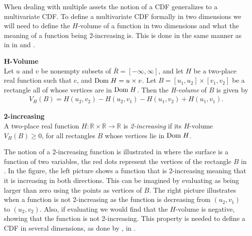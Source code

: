 When dealing with multiple assets the notion of a \gls{CDF} generalizes to a multivariate \gls{CDF}. To define a multivariate \gls{CDF} formally in two dimensions we will need to define the $H$-volume of a function in two dimensions and what the meaning of a function being 2-increasing is. This is done in the same manner as in  in  and .

\begin{definition}\label{def:H-volume} \textbf{H-Volume} \\
    Let $u$ and $v$ be nonempty subsets of $\bar{R} = [-\infty, \infty]$, and let $H$ be a two-place real function such that c, and $\mathrm{Dom \;} H = u\times v$. Let $B = [u_1,u_2]\times[v_1,v_2]$  be a rectangle all of whose vertices are in $\mathrm{Dom \;} H$. Then
    the \emph{H-volume} of $B$ is given by
    \begin{align}\label{eq:H-volume}
        V_H(B) = H(u_2,v_2) - H(u_2,v_1) - H(u_1,v_2) + H(u_1,v_1).
    \end{align}
\end{definition}

\begin{definition}\label{def:2-Increasing} \textbf{2-increasing} \\
     A two-place real function $H:\mathbb{R}\times\mathbb{R}\to \mathbb{R}$ is \emph{2-increasing} if its $H$-volume $V_H(B)\geq0$, for all rectangles $B$ whose vertices lie in $\mathrm{Dom \;} H$.
\end{definition}

The notion of a 2-increasing function is illustrated in  where the surface is a function of two variables, the red dots represent the vertices of the rectangle $B$ in . In the figure, the left picture shows a function that is 2-increasing meaning that it is increasing in both directions. This can be imagined by evaluating  as being larger than zero using the points as vertices of $B$. The right picture illustrates when a function is not 2-increasing as the function is decreasing from $(u_2,v_1)$ to $(u_2,v_2)$. Also, if evaluating  we would find that the $H$-volume is negative, showing that the function is not 2-increasing. This property is needed to define a \gls{CDF} in several dimensions, as done by , in . 

